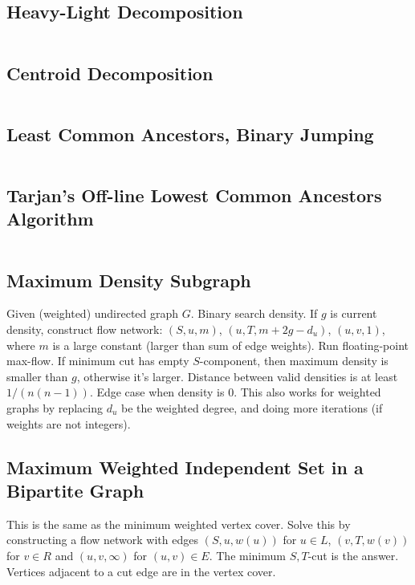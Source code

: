 \documentclass[9pt,a4paper,twocolumn,landscape,oneside]{amsart}
\newcommand{\code}[1]{\inputminted{cpp}{_code/#1}}
\begin{document}
    \subsection{Heavy-Light Decomposition}
        \code{graph/hld.cpp}

    \subsection{Centroid Decomposition}
        \code{graph/centroid_decomposition.cpp}

    \subsection{Least Common Ancestors, Binary Jumping}
        \code{graph/lca.cpp}

    \subsection{Tarjan's Off-line Lowest Common Ancestors Algorithm}
        \code{graph/tarjan_olca.cpp}

    \subsection{Maximum Density Subgraph}
        Given (weighted) undirected graph $G$. Binary search density. If $g$ is
        current density, construct flow network: $(S, u, m)$, $(u, T,
        m+2g-d_u)$, $(u,v,1)$, where $m$ is a large constant (larger than sum
        of edge weights). Run floating-point max-flow. If minimum cut has empty
        $S$-component, then maximum density is smaller than $g$, otherwise it's
        larger. Distance between valid densities is at least $1/(n(n-1))$. Edge
        case when density is $0$. This also works for weighted graphs by
        replacing $d_u$ be the weighted degree, and doing more iterations (if
        weights are not integers).

    \subsection{Maximum Weighted Independent Set in a Bipartite Graph}
        This is the same as the minimum weighted vertex cover. Solve this by
        constructing a flow network with edges $(S,u,w(u))$ for $u\in L$,
        $(v,T,w(v))$ for $v\in R$ and $(u,v,\infty)$ for $(u,v)\in E$. The
        minimum $S,T$-cut is the answer. Vertices adjacent to a cut edge are
        in the vertex cover.
\end{document}
